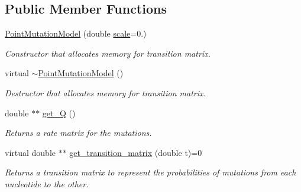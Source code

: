 \subsection*{Public Member Functions}
\begin{DoxyCompactItemize}
\item 
\mbox{\label{classrcombinator_1_1PointMutationModel_a099dd1d991389c50d1e22f6d25dc913d}} 
\mbox{\hyperlink{classrcombinator_1_1PointMutationModel_a099dd1d991389c50d1e22f6d25dc913d}{Point\+Mutation\+Model}} (double \mbox{\hyperlink{classrcombinator_1_1PointMutationModel_a328a30a438bb1b6a625faa3f714a85c8}{scale}}=0.)
\begin{DoxyCompactList}\small\item\em Constructor that allocates memory for transition matrix. \end{DoxyCompactList}\item 
virtual \mbox{\hyperlink{classrcombinator_1_1PointMutationModel_a2ac7ebc4b6264c6597808574501e45e5}{$\sim$\+Point\+Mutation\+Model}} ()
\begin{DoxyCompactList}\small\item\em Destructor that allocates memory for transition matrix. \end{DoxyCompactList}\item 
double $\ast$$\ast$ \mbox{\hyperlink{classrcombinator_1_1PointMutationModel_a43457739c51566273d471098dc2cacf0}{get\+\_\+Q}} ()
\begin{DoxyCompactList}\small\item\em Returns a rate matrix for the mutations. \end{DoxyCompactList}\item 
virtual double $\ast$$\ast$ \mbox{\hyperlink{classrcombinator_1_1PointMutationModel_a35a8b397c8fa932cd870174aa45180da}{get\+\_\+transition\+\_\+matrix}} (double t)=0
\begin{DoxyCompactList}\small\item\em Returns a transition matrix to represent the probabilities of mutations from each nucleotide to the other. \end{DoxyCompactList}\end{DoxyCompactItemize}

